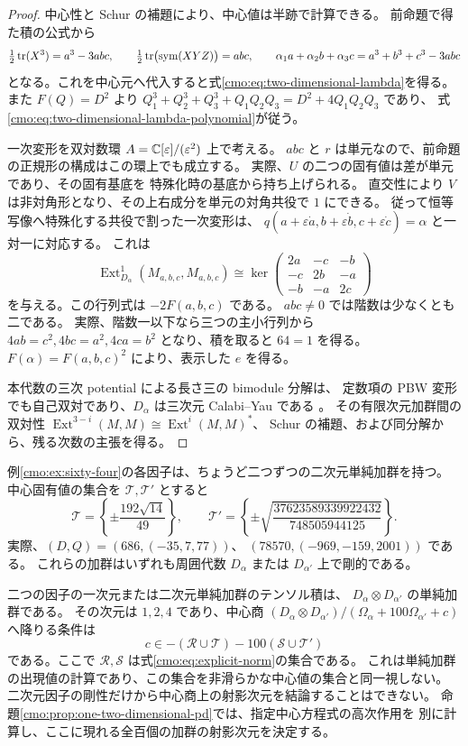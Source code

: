 \begin{proof}
中心性と Schur の補題により、中心値は半跡で計算できる。
前命題で得た積の公式から
\[
 \tfrac12\operatorname{tr}(X^3)=a^3-3abc,\qquad
 \tfrac12\operatorname{tr}\bigl(\operatorname{sym}(XYZ)\bigr)=abc,
 \qquad
 \alpha_1a+\alpha_2b+\alpha_3c=a^3+b^3+c^3-3abc
\]
となる。これを中心元へ代入すると式\eqref{cmo:eq:two-dimensional-lambda}を得る。
また $F(Q)=D^2$ より
$Q_1^3+Q_2^3+Q_3^3+Q_1Q_2Q_3=D^2+4Q_1Q_2Q_3$ であり、
式\eqref{cmo:eq:two-dimensional-lambda-polynomial}が従う。

一次変形を双対数環 $A=\mathbb C[\varepsilon]/(\varepsilon^2)$ 上で考える。
$abc$ と $r$ は単元なので、前命題の正規形の構成はこの環上でも成立する。
実際、$U$ の二つの固有値は差が単元であり、その固有基底を
特殊化時の基底から持ち上げられる。
直交性により $V$ は非対角形となり、その上右成分を単元の対角共役で $1$ にできる。
従って恒等写像へ特殊化する共役で割った一次変形は、
$q(a+\varepsilon\dot a,b+\varepsilon\dot b,c+\varepsilon\dot c)=\alpha$ と一対一に対応する。
これは
\[
 \operatorname{Ext}^1_{D_\alpha}(M_{a,b,c},M_{a,b,c})
 \cong\ker
 \begin{pmatrix}
 2a&-c&-b\\-c&2b&-a\\-b&-a&2c
 \end{pmatrix}
\]
を与える。この行列式は $-2F(a,b,c)$ である。
$abc\ne0$ では階数は少なくとも二である。
実際、階数一以下なら三つの主小行列から
$4ab=c^2,4bc=a^2,4ca=b^2$ となり、積を取ると $64=1$ を得る。
$F(\alpha)=F(a,b,c)^2$ により、表示した $e$ を得る。

本代数の三次 potential による長さ三の bimodule 分解は、
定数項の PBW 変形でも自己双対であり、$D_\alpha$ は三次元 Calabi--Yau である
\cite[Theorem~3.3.2]{NFMEG}。
その有限次元加群間の双対性
$\operatorname{Ext}^{3-i}(M,M)\cong\operatorname{Ext}^{i}(M,M)^*$、
Schur の補題、および同分解から、残る次数の主張を得る。
\end{proof}

\begin{example}
\label{cmo:ex:two-dimensional-sixty-four}
例\ref{cmo:ex:sixty-four}の各因子は、ちょうど二つずつの二次元単純加群を持つ。
中心固有値の集合を $\mathcal T,\mathcal T'$ とすると
\[
 \mathcal T=\left\{\pm\frac{192\sqrt{14}}{49}\right\},\qquad
 \mathcal T'=\left\{\pm\sqrt{\frac{37623589339922432}{748505944125}}\right\}.
\]
実際、$(D,Q)=(686,(-35,7,77))$、
$(78570,(-969,-159,2001))$ である。
これらの加群はいずれも周囲代数 $D_\alpha$ または $D_{\alpha'}$ 上で剛的である。

二つの因子の一次元または二次元単純加群のテンソル積は、
$D_\alpha\otimes D_{\alpha'}$ の単純加群である。
その次元は $1,2,4$ であり、中心商
$(D_\alpha\otimes D_{\alpha'})/(\Omega_\alpha+100\Omega_{\alpha'}+c)$
へ降りる条件は
\[
 c\in-(\mathcal R\cup\mathcal T)-100(\mathcal S\cup\mathcal T')
\]
である。ここで $\mathcal R,\mathcal S$ は式\eqref{cmo:eq:explicit-norm}の集合である。
これは単純加群の出現値の計算であり、この集合を非滑らかな中心値の集合と同一視しない。
二次元因子の剛性だけから中心商上の射影次元を結論することはできない。
命題\ref{cmo:prop:one-two-dimensional-pd}では、指定中心方程式の高次作用を
別に計算し、ここに現れる全百個の加群の射影次元を決定する。
\end{example}

